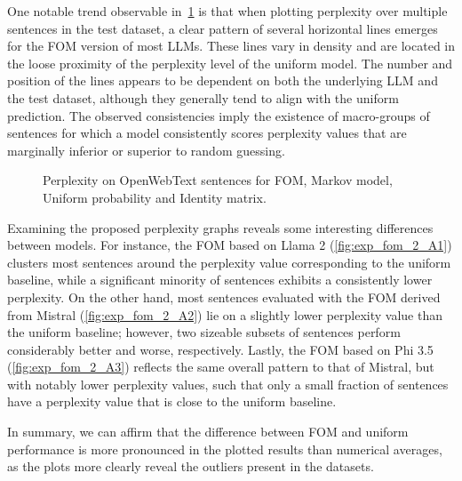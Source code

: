 One notable trend observable in~\cref{fig:exp_fom_2_A} is that when plotting perplexity over multiple sentences in the test dataset, a clear pattern of several horizontal lines emerges for the FOM version of most LLMs.
These lines vary in density and are located in the loose proximity of the perplexity level of the uniform model.
The number and position of the lines appears to be dependent on both the underlying LLM and the test dataset, although they generally tend to align with the uniform prediction.
The observed consistencies imply the existence of macro-groups of sentences for which a model consistently scores perplexity values that are marginally inferior or superior to random guessing.

\begin{figure}[t!]
    \centering
    \quad
    \caption{Perplexity on OpenWebText sentences for FOM, Markov model, Uniform probability and Identity matrix.}
    \label{fig:exp_fom_2_A}
\end{figure}

Examining the proposed perplexity graphs reveals some interesting differences between models.
For instance, the FOM based on Llama 2 (\cref{fig:exp_fom_2_A1}) clusters most sentences around the perplexity value corresponding to the uniform baseline, while a significant minority of sentences exhibits a consistently lower perplexity.
On the other hand, most sentences evaluated with the FOM derived from Mistral (\cref{fig:exp_fom_2_A2}) lie on a slightly lower perplexity value than the uniform baseline; however, two sizeable subsets of sentences perform considerably better and worse, respectively.
Lastly, the FOM based on Phi 3.5 (\cref{fig:exp_fom_2_A3}) reflects the same overall pattern to that of Mistral, but with notably lower perplexity values, such that only a small fraction of sentences have a perplexity value that is close to the uniform baseline.

In summary, we can affirm that the difference between FOM and uniform performance is more pronounced in the plotted results than numerical averages, as the plots more clearly reveal the outliers present in the datasets.


